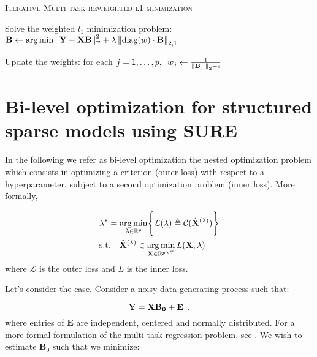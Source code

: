 \documentclass[a4paper,10pt]{article}
\theoremstyle{definition}
\begin{document}
\vskip 0.2in

{\fontsize{4}{4}\selectfont
\begin{algorithm}[h]  %
\caption{\textsc{Iterative Multi-task reweighted l1 minimization}
}
%

    {
        Solve the weighted $l_1$ minimization problem:
        $\mathbf{B} \leftarrow \operatorname*{arg\,min} \left \lVert \mathbf{Y} -  \mathbf{XB} \right \rVert_{\text{F}}^2 + \lambda \left \lVert \text{diag}(w) \cdot \mathbf{B} \right \rVert_{2, 1}$

        Update the weights: for each
        $j = 1, \dots, p, \enspace w_j \leftarrow \frac{1}{\left \lVert \mathbf{B}_{j:} \right \rVert_2 + \epsilon}$
    }

\end{algorithm}
}

\newpage

\section{Bi-level optimization for structured sparse models using SURE}
\label{section_6}

In the following we refer as bi-level optimization the nested optimization problem
which consists in optimizing a criterion (outer loss) with respect to a hyperparameter, subject to
a second optimization problem (inner loss). More formally,

\begin{align*}
    &\lambda^* = \operatorname*{arg\,min}_{\lambda \in \mathbb{R}^p} \Biggl\{\mathcal{L}(\lambda) \triangleq \mathcal{C}(\hat{\mathbf{X}}^{(\lambda)})\Biggr\} \\
    &\text{s.t.} \quad \hat{\mathbf{X}}^{(\lambda)} \in \operatorname*{arg\,min}_{\mathbf{X} \in \mathbb{R}^{p\times T}} L(\mathbf{X}, \lambda)
\end{align*}
%
where $\mathcal{L}$ is the outer loss and $L$ is the inner loss.

Let's consider the  case. Consider a noisy data generating process such that:

\begin{equation*}
    \bf Y = XB_0 + E
    \enspace .
\end{equation*}
%
where entries of $\mathbf{E}$ are independent, centered and normally distributed.
For a more formal formulation of the multi-task regression problem, see \cite{Massias_Fercoq_Gramfort_Salmon17}. We wish to estimate
$\mathbf{B}_0$ such that we minimize:
\end{document}
